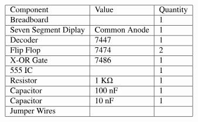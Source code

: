 \begin{align}
\begin{tabular}{|l|l|l|}\hline
	Component	&Value &Quantity\\ \hline
	Breadboard & &1 \\ \hline
	Seven Segment Diplay &Common Anode &1 \\ \hline
	Decoder &7447 &1 \\ \hline
	Flip Flop &7474 &2 \\ \hline
	X-OR Gate &7486 &1 \\ \hline
	555 IC & &1 \\ \hline
	Resistor &1 K$\Omega$ &1 \\ \hline
	Capacitor &100 nF &1 \\ \hline
	Capacitor &10 nF &1 \\ \hline
	Jumper Wires & & \\ \hline
\end{tabular}
\end{align}
